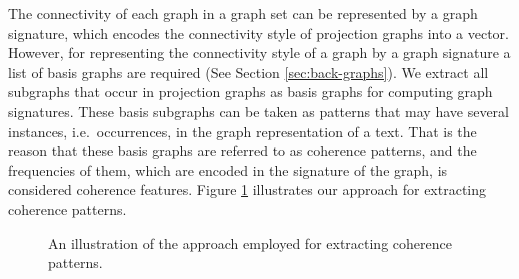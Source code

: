 The connectivity of each graph in a graph set can be represented by a graph signature, which encodes the connectivity style of projection graphs into a vector. 
However, for representing the connectivity style of a graph by a graph signature a list of basis graphs are required (See Section \ref{sec:back-graphs}).  
We extract all subgraphs that occur in projection graphs as basis graphs for computing graph signatures. 
These basis subgraphs can be taken as patterns that may have several instances, i.e.\ occurrences, in the graph representation of a text.  
That is the reason that these basis graphs are referred to as coherence patterns, and the frequencies of them, which are encoded in the signature of the graph, is considered coherence features. 
Figure \ref{fig:pattern-extraction} illustrates our approach for extracting coherence patterns.

\begin{figure}[!ht]
	\begin{center}
	\end{center}
	\caption{An illustration of the approach employed for extracting coherence patterns.}
	\label{fig:pattern-extraction}
\end{figure}


